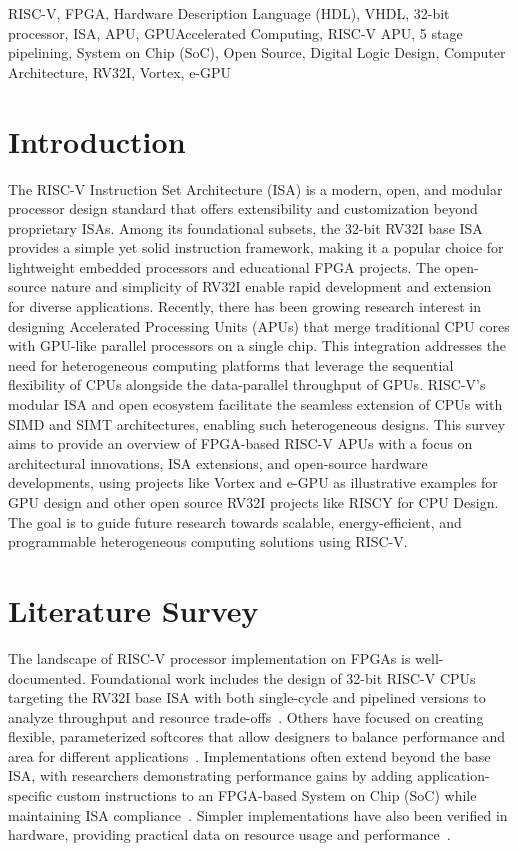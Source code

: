 \documentclass[conference]{IEEEtran}
\begin{document}
\begin{IEEEkeywords}
RISC-V, FPGA, Hardware Description Language (HDL), VHDL, 32-bit processor, ISA, APU, GPUAccelerated Computing, RISC-V APU, 5 stage pipelining, System on Chip (SoC), Open Source, Digital Logic Design, Computer Architecture, RV32I, Vortex, e-GPU
\end{IEEEkeywords}

\section{Introduction}
The RISC-V Instruction Set Architecture (ISA) is a modern, open, and modular processor design standard that offers extensibility and customization beyond proprietary ISAs. Among its foundational subsets, the 32-bit RV32I base ISA provides a simple yet solid instruction framework, making it a popular choice for lightweight embedded processors and educational FPGA projects. The open-source nature and simplicity of RV32I enable rapid development and extension for diverse applications. Recently, there has been growing research interest in designing Accelerated Processing Units (APUs) that merge traditional CPU cores with GPU-like parallel processors on a single chip. This integration addresses the need for heterogeneous computing platforms that leverage the sequential flexibility of CPUs alongside the data-parallel throughput of GPUs. RISC-V’s modular ISA and open ecosystem facilitate the seamless extension of CPUs with SIMD and SIMT architectures, enabling such heterogeneous designs. This survey aims to provide an overview of FPGA-based RISC-V APUs with a focus on architectural innovations, ISA extensions, and open-source hardware developments, using projects like Vortex and e-GPU as illustrative examples for GPU design and other open source RV32I projects like RISCY for CPU Design. The goal is to guide future research towards scalable, energy-efficient, and programmable heterogeneous computing solutions using RISC-V.

\section{Literature Survey}
The landscape of RISC-V processor implementation on FPGAs is well-documented. Foundational work includes the design of 32-bit RISC-V CPUs targeting the RV32I base ISA with both single-cycle and pipelined versions to analyze throughput and resource trade-offs~\cite{b1}. Others have focused on creating flexible, parameterized softcores that allow designers to balance performance and area for different applications~\cite{b5}. Implementations often extend beyond the base ISA, with researchers demonstrating performance gains by adding application-specific custom instructions to an FPGA-based System on Chip (SoC) while maintaining ISA compliance~\cite{b6}. Simpler implementations have also been verified in hardware, providing practical data on resource usage and performance~\cite{b7}.
\end{document}

